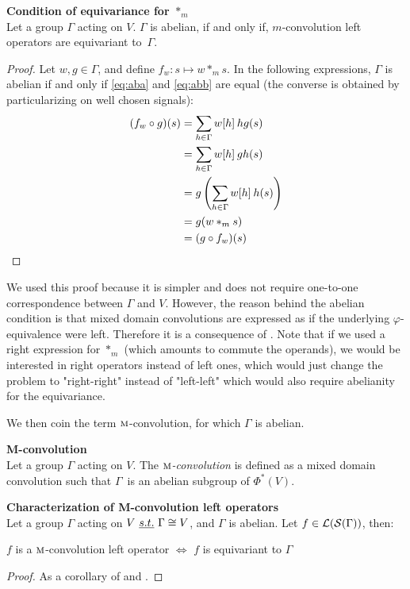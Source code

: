 \begin{proposition}\textbf{Condition of equivariance for $\ast_m$}\\
Let a group $\Gamma$ acting on $V$. $\Gamma$ is abelian, if and only if, $m$-convolution left operators are equivariant to~$\Gamma$.
\label{prop:equiM}
\end{proposition}
\begin{proof}
Let $w, g \in \Gamma$, and define $f_w: s \mapsto w \ast_m s$. In the following expressions, $\Gamma$ is abelian if and only if \eqref{eq:aba} and \eqref{eq:abb} are equal (the converse is obtained by particularizing on well chosen signals):
\begin{align}
(f_w \circ g) (s) & = \displaystyle \sum_{h \in \Gamma} w[h] \h{2} hg(s) \label{eq:aba}\\
 & = \displaystyle \sum_{h \in \Gamma} w[h] \h{2} gh(s) \label{eq:abb}\\
 & = \displaystyle g\left(\sum_{h \in \Gamma} w[h] \h{2} h(s)\right) \nn\\
 & = g(w \ast_m s ) \nn\\
 & = (g \circ f_w) (s) \nn
\end{align}
\end{proof}

\begin{remark}
We used this proof because it is simpler and does not require one-to-one correspondence between $\Gamma$ and $V$. However, the reason behind the abelian condition is that mixed domain convolutions are expressed as if the underlying $\varphi$-equivalence were left. Therefore it is a consequence of . Note that if we used a right expression for $\ast_m$ (which amounts to commute the operands), we would be interested in right operators instead of left ones, which would just change the problem to "right-right" instead of "left-left" which would also require abelianity for the equivariance.
\end{remark}

We then coin the term $\M$-convolution, for which $\Gamma$ is abelian.

\begin{definition}\textbf{M-convolution}\\
Let a group $\Gamma$ acting on $V$.
The \emph{$\M$-convolution} is defined as a mixed domain convolution such that $\Gamma$~is an abelian subgroup of $\Phi^*(V)$.
\end{definition}

\begin{corollary}\textbf{Characterization of M-convolution left operators}\\
Let a group $\Gamma$ acting on $V~\st \Gamma \cong V$, and $\Gamma$ is abelian. Let $f \in \cl(\cs(\Gamma))$, then:\\
\centerline{$f$ is a $\M$-convolution left operator $\Leftrightarrow$ $f$ is equivariant to $\Gamma$}
\label{cor:equiM}
\end{corollary}
\begin{proof}As a corollary of  and .
\end{proof}

